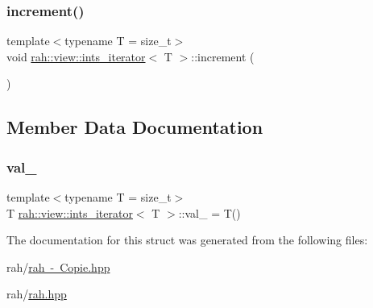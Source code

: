\mbox{\label{structrah_1_1view_1_1ints__iterator_a34e88e12edf3a728ee91c706749bd1c0}} 
\subsubsection{\texorpdfstring{increment()}{increment()}\hspace{0.1cm}{\footnotesize\ttfamily [2/2]}}
{\footnotesize\ttfamily template$<$typename T  = size\+\_\+t$>$ \\
void \mbox{\hyperlink{structrah_1_1view_1_1ints__iterator}{rah\+::view\+::ints\+\_\+iterator}}$<$ T $>$\+::increment (\begin{DoxyParamCaption}{ }\end{DoxyParamCaption})\hspace{0.3cm}{\ttfamily [inline]}}



\subsection{Member Data Documentation}
\mbox{\label{structrah_1_1view_1_1ints__iterator_a0136f64c4fdb5dd020ba213c1cc57f28}} 
\subsubsection{\texorpdfstring{val\_}{val\_}}
{\footnotesize\ttfamily template$<$typename T  = size\+\_\+t$>$ \\
T \mbox{\hyperlink{structrah_1_1view_1_1ints__iterator}{rah\+::view\+::ints\+\_\+iterator}}$<$ T $>$\+::val\+\_\+ = T()}



The documentation for this struct was generated from the following files\+:\begin{DoxyCompactItemize}
\item 
rah/\mbox{\hyperlink{rah_01-_01_copie_8hpp}{rah -\/ Copie.\+hpp}}\item 
rah/\mbox{\hyperlink{rah_8hpp}{rah.\+hpp}}\end{DoxyCompactItemize}
